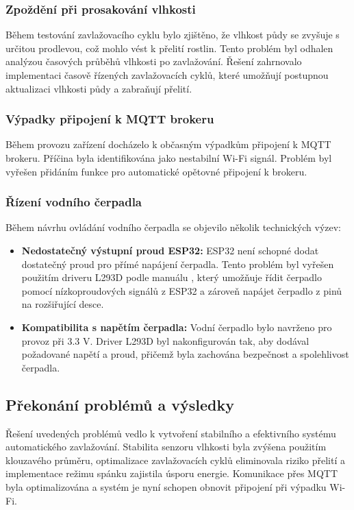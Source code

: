\documentclass[a4paper, 11pt]{article}
\begin{document}
\subsubsection{Zpoždění při prosakování vlhkosti}
Během testování zavlažovacího cyklu bylo zjištěno, že vlhkost půdy se zvyšuje s určitou prodlevou, což mohlo vést k přelití rostlin. 
Tento problém byl odhalen analýzou časových průběhů vlhkosti po zavlažování. Řešení zahrnovalo implementaci časově řízených zavlažovacích cyklů, 
které umožňují postupnou aktualizaci vlhkosti půdy a zabraňují přelití.

\subsubsection{Výpadky připojení k MQTT brokeru}
Během provozu zařízení docházelo k občasným výpadkům připojení k MQTT brokeru. Příčina byla identifikována jako nestabilní Wi-Fi signál. 
Problém byl vyřešen přidáním funkce pro automatické opětovné připojení k brokeru.

\subsubsection{Řízení vodního čerpadla}
Během návrhu ovládání vodního čerpadla se objevilo několik technických výzev:

\begin{itemize}
    \item \textbf{Nedostatečný výstupní proud ESP32:} ESP32 není schopné dodat dostatečný proud pro přímé napájení čerpadla. Tento problém byl vyřešen použitím driveru L293D podle manuálu \cite{sunfounder_pump_esp32}, který umožňuje řídit čerpadlo pomocí nízkoproudových signálů z ESP32 a zároveň napájet čerpadlo z pinů na rozšiřující desce.
    \item \textbf{Kompatibilita s napětím čerpadla:} Vodní čerpadlo bylo navrženo pro provoz při 3.3 V. Driver L293D byl nakonfigurován tak, aby dodával požadované napětí a proud, přičemž byla zachována bezpečnost a spolehlivost čerpadla.
\end{itemize}

\subsection{Překonání problémů a výsledky}

Řešení uvedených problémů vedlo k vytvoření stabilního a efektivního systému automatického zavlažování. 
Stabilita senzoru vlhkosti byla zvýšena použitím klouzavého průměru, optimalizace zavlažovacích cyklů eliminovala riziko přelití
a implementace režimu spánku zajistila úsporu energie. Komunikace přes MQTT byla optimalizována a systém je nyní schopen obnovit připojení při výpadku Wi-Fi.
\end{document}
